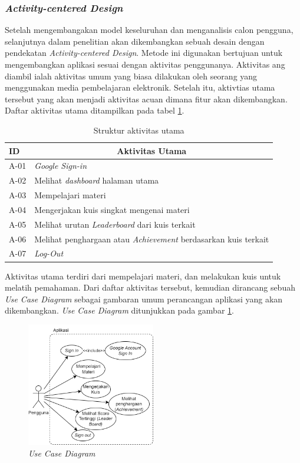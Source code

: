 \subsubsection{\textit{Activity-centered Design}}
Setelah mengembangakan model keseluruhan dan menganalisis calon pengguna, selanjutnya dalam penelitian akan dikembangkan sebuah desain dengan pendekatan \textit{Activity-centered Design}.
Metode ini digunakan bertujuan untuk mengembangkan aplikasi sesuai dengan aktivitas penggunanya.
Aktivitas ang diambil ialah aktivitas umum yang biasa dilakukan oleh seorang yang menggunakan media pembelajaran elektronik.
Setelah itu, aktivtias utama tersebut yang akan menjadi aktivitas acuan dimana fitur akan dikembangkan. Daftar aktivitas utama ditampilkan pada tabel \ref*{Tab: Tabel Main Activity}.
\begin{table}[H]
	\centering
	\caption{Struktur aktivitas utama}
	\begin{tabular}{|m{1cm}|m{}|}
		\hline
		\centering \textbf{ID} & \multicolumn{1}{c|}{\centering \textbf{Aktivitas Utama}}\\
		\hline
		A-01 & \textit{Google Sign-in} \\
		\hline
		A-02 & Melihat \textit{dashboard} halaman utama\\
		\hline
		A-03 & Mempelajari materi\\
		\hline
		A-04 & Mengerjakan kuis singkat mengenai materi \\
		\hline
		A-05 & Melihat urutan \textit{Leaderboard} dari kuis terkait\\
		\hline
		A-06 & Melihat penghargaan atau \textit{Achievement} berdasarkan kuis terkait \\
		\hline
		A-07 & \textit{Log-Out}\\
		\hline
	\end{tabular}
	\label{Tab: Tabel Main Activity}
\end{table}
Aktivitas utama terdiri dari mempelajari materi, dan melakukan kuis untuk melatih pemahaman.
Dari daftar aktivitas tersebut, kemudian dirancang sebuah \textit{Use Case Diagram} sebagai gambaran umum perancangan aplikasi yang akan dikembangkan. \textit{Use Case Diagram} ditunjukkan pada gambar \ref*{Fig:Use Case Diagram}. 
\begin{figure}[H]
	\centering
	\includegraphics[width=0.5\textwidth]{contents/chapter-3/images/Use-Case-Diagram.png}
	\caption{\textit{Use Case Diagram}}
	\label{Fig:Use Case Diagram}
\end{figure}

